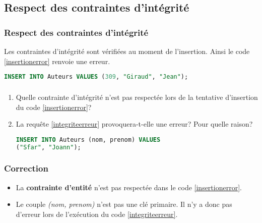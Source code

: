 \documentclass[svgnames,11pt]{beamer}
\begin{document}
\subsection{Respect des contraintes d'intégrité}
\begin{frame}[fragile]
    \frametitle{Respect des contraintes d'intégrité}

    Les contraintes d'intégrité sont vérifiées au moment de l'insertion. Ainsi le code \ref{insertionerror} renvoie une erreur.
    \begin{center}
        \begin{lstlisting}[language=SQL , basicstyle=\ttfamily\small, xleftmargin=1em, xrightmargin=-1em]
INSERT INTO Auteurs VALUES (309, "Giraud", "Jean");
\end{lstlisting}
        \label{insertionerror}
    \end{center}

\end{frame}
\begin{frame}[fragile]
    \frametitle{}

    \begin{activite}
        \begin{enumerate}
            \item Quelle contrainte d'intégrité n'est pas respectée lors de la tentative d'insertion du code \ref{insertionerror}?
            \item La requête \ref{integriteerreur} provoquera-t-elle une erreur? Pour quelle raison?
                  \begin{center}
                      \begin{lstlisting}[language=SQL , basicstyle=\ttfamily\small, xleftmargin=1em, xrightmargin=-1em]
INSERT INTO Auteurs (nom, prenom) VALUES 
("Sfar", "Joann");
\end{lstlisting}
                      \label{integriteerreur}
                  \end{center}
        \end{enumerate}
    \end{activite}

\end{frame}
\begin{frame}
    \frametitle{Correction}

    \begin{itemize}
        \item La \textbf{contrainte d'entité} n'est pas respectée dans le code \ref{insertionerror}.
        \item Le couple \emph{(nom, prenom)} n'est pas une clé primaire. Il n'y a donc pas d'erreur lors de l'exécution du code \ref{integriteerreur}.
    \end{itemize}

\end{frame}
\end{document}
